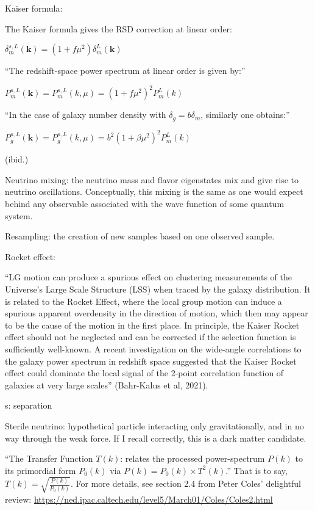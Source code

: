 \documentclass[11pt]{article}
\begin{document}
Kaiser formula:

The Kaiser formula gives the RSD correction at linear order:

$\delta_m^{s, L} (\bm{k}) = (1 + f \mu^2) \delta_m^L (\bm{k})$

``The redshift-space power spectrum at linear order is given by:''

$P_m^{s, L} (\bm{k}) = P_m^{s, L} (k, \mu) = (1 + f \mu^2)^2 P_m^L (k)$

``In the case of galaxy number density with $\delta_g = b \delta_m$, similarly
one obtains:''

$
P_g^{s, L} (\bm{k})
=
P_g^{s, L} (k, \mu)
=
b^2 (1 + \beta \mu^2)^2 P_m^L (k)
$

(ibid.)

Neutrino mixing: the neutrino mass and flavor eigenstates mix and give rise
to neutrino oscillations. Conceptually, this mixing is the same as  one would
expect behind any observable associated with the wave function of some quantum
system.

Resampling: the creation of new samples based on one observed sample.

Rocket effect:

``LG motion can produce a spurious effect on clustering measurements of the
Universe’s Large Scale Structure (LSS) when traced by the galaxy distribution.
It is related to the Rocket Effect, where the local group motion can induce a
spurious apparent overdensity in the direction of motion, which then may appear
to be the cause of the motion in the first place. In principle, the Kaiser
Rocket effect should not be neglected and can be corrected if the selection
function is sufficiently well-known. A recent investigation on the wide-angle
correlations to the galaxy power spectrum in redshift space suggested that the
Kaiser Rocket effect could dominate the local signal of the 2-point correlation
function of galaxies at very large scales'' (Bahr-Kalus et al, 2021).

s: separation

Sterile neutrino: hypothetical particle interacting only gravitationally, and
in no way through the weak force. If I recall correctly, this is a dark matter
candidate.

``The Transfer Function $T(k)$: relates the processed power-spectrum $P(k)$ to
its primordial form $P_0(k)$ via $P(k) = P_0(k) \times T^2(k)$.'' That is to
say, $T(k) = \sqrt{\frac{P(k)}{P_0(k)}}$. For more details, see section 2.4
from Peter Coles' delightful review:
\url{https://ned.ipac.caltech.edu/level5/March01/Coles/Coles2.html}
\end{document}
